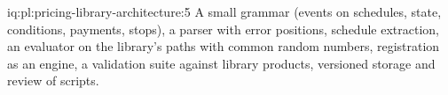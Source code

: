 \begin{solution}{iq:pl:pricing-library-architecture:5}
A small grammar (events on schedules, state, conditions, payments, stops), a parser with error positions, schedule extraction, an evaluator on
the library's paths with common random numbers, registration as an engine, a validation suite against library products, versioned storage and
review of scripts.
\end{solution}
